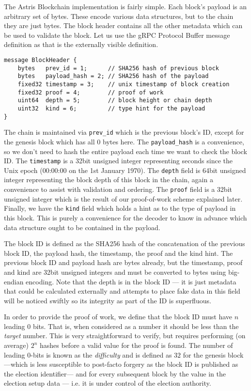 The Astris Blockchain implementation is fairly simple. Each block's payload is an arbitrary set of bytes. These encode various data structures, but to the chain they are just bytes. The block header contains all the other metadata which can be used to validate the block. Let us use the gRPC Protocol Buffer message definition as that is the externally visible definition.

\begin{lstlisting}[language=protobuf3, style=protobuf]
message BlockHeader {
    bytes   prev_id = 1;      // SHA256 hash of previous block
    bytes   payload_hash = 2; // SHA256 hash of the payload
    fixed32 timestamp = 3;    // unix timestamp of block creation
    fixed32 proof = 4;        // proof of work
    uint64  depth = 5;        // block height or chain depth
    uint32  kind = 6;         // type hint for the payload
}
\end{lstlisting}


The chain is maintained via \texttt{prev\_id} which is the previous block's ID, except for the genesis block which has all $0$ bytes here. The \texttt{payload\_hash} is a convenience, so we don't need to hash the entire payload each time we want to check the block ID. The \texttt{timestamp} is a 32bit unsigned integer representing seconds since the Unix epoch (00:00:00 on the 1st January 1970). The \texttt{depth} field is 64bit unsigned integer representing the block depth of this block in the chain, again a convenience to assist with validation and ordering. The \texttt{proof} field is a 32bit unsigned integer which is the result of our proof-of-work scheme explained later. Finally, we have the \texttt{kind} field which holds a hint as to the type of payload in this block. This is purely a convenience for the decoder to know in advance which data structure ought to be contained in the payload.

The block ID is defined as the SHA256 hash of the concatenation of the previous block ID, the payload hash, the timestamp, the proof and the kind hint. The previous block ID and payload hash are bytes already, but the timestamp, proof and kind are 32bit unsigned integers and must be converted to bytes using big-endian encoding. Note that the depth is in the block ID --- it is just metadata that could be calculated externally and attempts to place fake data in this field will be noticed swiftly so its integrity as part of the ID is superfluous.

In order to provide the proof of work, we define that the block ID must have $n$ leading 0 bits. That is, when considered as a number it should be less than the \emph{target} number. This is very straightforward to verify, but requires performing (on average) $2^n$ hashes before a valid value for the proof is found. The number of leading 0-bits is known as the \emph{difficulty} and is defined as $32$ for the genesis block ---which is less susceptible to post-facto forgery as the block ID is published as the election identifier--- and for every subsequent block by the value in the election setup data --- i.e. it is under control of the election authority.

